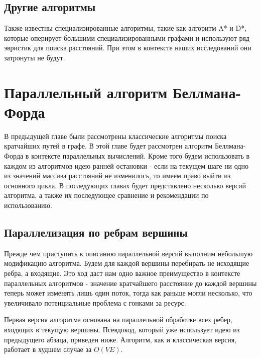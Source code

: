 \FloatBarrier
\subsection{Другие алгоритмы}

Также известны специализированные алгоритмы, такие как алгоритм A* и D*, которые оперирует большими специализированными графами и используют ряд эвристик для поиска расстояний. При этом в контексте наших исследований они затронуты не будут.

\FloatBarrier
\section{Параллельный алгоритм Беллмана-Форда}

В предыдущей главе были рассмотрены классические алгоритмы поиска кратчайших путей в графе. В этой главе будет рассмотрен алгоритм Беллмана-Форда в контексте параллельных вычислений. Кроме того будем использовать в каждом из алгоритмов идею ранней остановки - если на текущем шаге ни одно из значений массива расстояний не изменилось, то имеем право выйти из основного цикла. В последующих главах будет представлено несколько версий алгоритма, а также их последующее сравнение и рекомендации по использованию.  

\FloatBarrier
\subsection{Параллелизация по ребрам вершины}

Прежде чем приступить к описанию параллельной версий выполним небольшую модификацию алгоритма. Будем для каждой вершины перебирать не исходящие ребра, а входящие. Это ход даст нам одно важное преимущество в контексте параллельных алгоритмов - значение кратчайшего расстояние до каждой вершины теперь может изменять лишь один поток, тогда как раньше могли несколько, что увеличивало потенциальные проблема с гонками за ресурс.

Первая версия алгоритма основана на параллельной обработке всех ребер, входящих в текущую вершины. Псевдокод, который уже использует идею из предыдущего абзаца, приведен ниже. Алгоритм, как и классическая версия, работает в худшем случае за $O(VE)$. 


